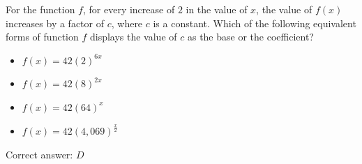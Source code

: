 \documentclass{article}
\begin{document}
\begin{tcolorbox}[colback=blue!5!white, colframe=blue!75!black, title=Question 15]
For the function \( f \), for every increase of \(2\) in the value of \( x \), the value of \( f(x) \) increases by a factor of \( c \), where \( c \) is a constant.
Which of the following equivalent forms of function \( f \) displays the value of \( c \) as the base or the coefficient?

\begin{itemize}
    \item[A.] \( f(x) = 42(2)^{6x} \)
    \item[B.] \( f(x) = 42(8)^{2x} \)
    \item[C.] \( f(x) = 42(64)^x \)
    \item[D.] \( f(x) = 42(4,069)^{\frac{x}{2}} \)
\end{itemize}
\end{tcolorbox}

\begin{tcolorbox}[colback=green!10, colframe=green!50!black, title=Answer]
Correct answer: \(D\)

\end{tcolorbox}
\end{document}
